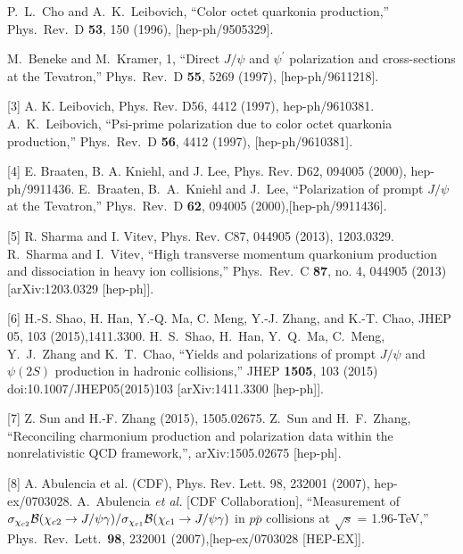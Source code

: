 \documentclass[aps,prc,preprint,superscriptaddress,showpacs,showkeys,amsmath]{revtex4-1}
\begin{document}
\noindent
\begin{thebibliography}{100}
\medskip


  P.~L.~Cho and A.~K.~Leibovich,
  ``Color octet quarkonia production,''
  Phys.\ Rev.\ D {\bf 53}, 150 (1996),
  [hep-ph/9505329].

  
  M.~Beneke and M.~Kramer, 1,
  ``Direct $J/\psi$ and $\psi^\prime$ polarization and cross-sections at the Tevatron,''
  Phys.\ Rev.\ D {\bf 55}, 5269 (1997), [hep-ph/9611218].

[3] A. K. Leibovich, Phys. Rev. D56, 4412 (1997), hep-ph/9610381.
  A.~K.~Leibovich,
  ``Psi-prime polarization due to color octet quarkonia production,''
  Phys.\ Rev.\ D {\bf 56}, 4412 (1997), [hep-ph/9610381].

[4] E. Braaten, B. A. Kniehl, and J. Lee, Phys. Rev. D62, 094005 (2000), hep-ph/9911436.
  E.~Braaten, B.~A.~Kniehl and J.~Lee,
  ``Polarization of prompt $J/\psi$ at the Tevatron,''
  Phys.\ Rev.\ D {\bf 62}, 094005 (2000),[hep-ph/9911436].

[5] R. Sharma and I. Vitev, Phys. Rev. C87, 044905 (2013), 1203.0329.
  R.~Sharma and I.~Vitev,
  ``High transverse momentum quarkonium production and dissociation in heavy ion collisions,''
  Phys.\ Rev.\ C {\bf 87}, no. 4, 044905 (2013)
  [arXiv:1203.0329 [hep-ph]].



[6] H.-S. Shao, H. Han, Y.-Q. Ma, C. Meng, Y.-J. Zhang, and K.-T. Chao, JHEP 05, 103 (2015),1411.3300.
  H.~S.~Shao, H.~Han, Y.~Q.~Ma, C.~Meng, Y.~J.~Zhang and K.~T.~Chao,
  ``Yields and polarizations of prompt $J/\psi$ and $\psi(2S)$ production in hadronic collisions,''
  JHEP {\bf 1505}, 103 (2015)
  doi:10.1007/JHEP05(2015)103
  [arXiv:1411.3300 [hep-ph]].


[7] Z. Sun and H.-F. Zhang (2015), 1505.02675.
  Z.~Sun and H.~F.~Zhang,
  ``Reconciling charmonium production and polarization data within the nonrelativistic QCD framework,'',
  arXiv:1505.02675 [hep-ph].

[8] A. Abulencia et al. (CDF), Phys. Rev. Lett. 98, 232001 (2007), hep-ex/0703028.
  A.~Abulencia {\it et al.} [CDF Collaboration],
  ``Measurement of $\sigma_{\chi_{c2}}{\cal B}(\chi_{c2} \to J/\psi \gamma)/\sigma_{\chi_{c1}} {\cal B}(\chi_{c1} \to J/\psi \gamma)$ 
  in $p \bar{p}$ collisions at $\sqrt{s}$ = 1.96-TeV,''
  Phys.\ Rev.\ Lett.\  {\bf 98}, 232001 (2007),[hep-ex/0703028 [HEP-EX]].


\end{thebibliography}
\end{document}
